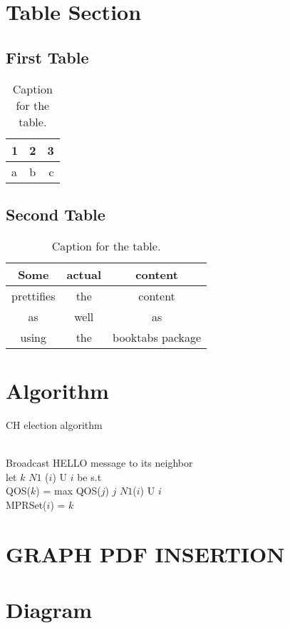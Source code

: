 \documentclass{article}
\begin{document}
\newpage
\section{Table Section}
\subsection{First Table}
\begin{table}[h!]
  \begin{center}
    \caption{Caption for the table.}
    \label{tab:table1}
    \begin{tabular}{l|c||r}
      1 & 2 & 3\\
      \hline
      a & b & c\\
    \end{tabular}
  \end{center}
\end{table}

\subsection{Second Table}
\begin{table}[h!]
  \begin{center}
    \caption{Caption for the table.}
    \label{tab:table2}
    \begin{tabular}{ccc}
      \toprule
      Some & actual & content\\
      \midrule
      prettifies & the & content\\
      as & well & as\\
      using & the & booktabs package\\
      \bottomrule
    \end{tabular}
  \end{center}
\end{table}
\newpage

\section{Algorithm}

\begin{algorithm}
\caption{CH election algorithm}
\label{CHalgorithm}
\begin{algorithmic}[1]
 {}
\\Broadcast HELLO message to its neighbor
\\let $k$  $N1$ ($i$) U {$i$} be s.t
\\QOS($k$) = max {QOS($j$) \textbar $j$  $N1$($i$)  U $i$}
\\ MPRSet($i$) = $k$
\EndFor
\EndProcedure
\end{algorithmic}
\end{algorithm}
\pagebreak
\newpage
\section{GRAPH PDF INSERTION}

\newpage
\section{Diagram}

\end{document}
